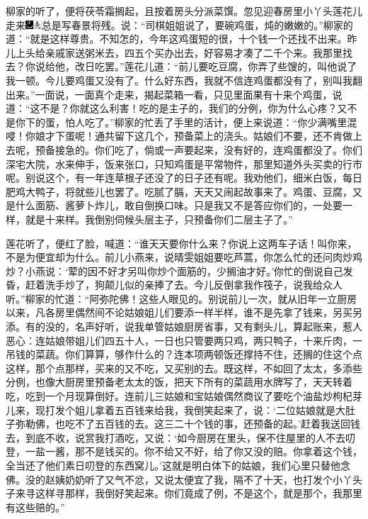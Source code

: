 柳家的听了，便将茯苓霜搁起，且按着房头分派菜馔。忽见迎春房里小丫头莲花儿走来{\includegraphics[width=3mm]{../Images/00003}\includegraphics[width=3mm]{../Images/00012}\footnotesize \kaishu 总是写春景将残。}说：“司棋姐姐说了，要碗鸡蛋，炖的嫩嫩的。”柳家的道：“就是这样尊贵。不知怎的，今年这鸡蛋短的很，十个钱一个还找不出来。昨儿上头给亲戚家送粥米去，四五个买办出去，好容易才凑了二千个来。我那里找去？你说给他，改日吃罢。”莲花儿道：“前儿要吃豆腐，你弄了些馊的，叫他说了我一顿。今儿要鸡蛋又没有了。什么好东西，我就不信连鸡蛋都没有了，别叫我翻出来。”一面说，一面真个走来，揭起菜箱一看，只见里面果有十来个鸡蛋，说道：“这不是？你就这么利害！吃的是主子的，我们的分例，你为什么心疼？又不是你下的蛋，怕人吃了。”柳家的忙丢了手里的活计，便上来说道：“你少满嘴里混唚！你娘才下蛋呢！通共留下这几个，预备菜上的浇头。姑娘们不要，还不肯做上去呢，预备接急的。你们吃了，倘或一声要起来，没有好的，连鸡蛋都没了。你们深宅大院，水来伸手，饭来张口，只知鸡蛋是平常物件，那里知道外头买卖的行市呢。别说这个，有一年连草根子还没了的日子还有呢。我劝他们，细米白饭，每日肥鸡大鸭子，将就些儿也罢了。吃腻了膈，天天又闹起故事来了。鸡蛋、豆腐，又是什么面筋、酱萝卜炸儿，敢自倒换口味。只是我又不是答应你们的，一处要一样，就是十来样。我倒别伺候头层主子，只预备你们二层主子了。”

莲花听了，便红了脸，喊道：“谁天天要你什么来？你说上这两车子话！叫你来，不是为便宜却为什么。前儿小燕来，说晴雯姐姐要吃芦蒿，你怎么忙的还问肉炒鸡炒？小燕说：‘荤的因不好才另叫你炒个面筋的，少搁油才好。’你忙的倒说自己发昏，赶着洗手炒了，狗颠儿似的亲捧了去。今儿反倒拿我作筏子，说我给众人听。”柳家的忙道：“阿弥陀佛！这些人眼见的。别说前儿一次，就从旧年一立厨房以来，凡各房里偶然间不论姑娘姐儿们要添一样半样，谁不是先拿了钱来，另买另添。有的没的，名声好听，说我单管姑娘厨房省事，又有剩头儿，算起账来，惹人恶心：连姑娘带姐儿们四五十人，一日也只管要两只鸡，两只鸭子，十来斤肉，一吊钱的菜蔬。你们算算，够作什么的？连本项两顿饭还撑持不住，还搁的住这个点这样，那个点那样，买来的又不吃，又买别的去。既这样，不如回了太太，多添些分例，也像大厨房里预备老太太的饭，把天下所有的菜蔬用水牌写了，天天转着吃，吃到一个月现算倒好。连前儿三姑娘和宝姑娘偶然商议了要吃个油盐炒枸杞芽儿来，现打发个姐儿拿着五百钱来给我，我倒笑起来了，说：‘二位姑娘就是大肚子弥勒佛，也吃不了五百钱的去。这三二十个钱的事，还预备的起。’赶着我送回钱去，到底不收，说赏我打酒吃，又说：‘如今厨房在里头，保不住屋里的人不去叨登，一盐一酱，那不是钱买的。你不给又不好，给了你又没的赔。你拿着这个钱，全当还了他们素日叨登的东西窝儿。’这就是明白体下的姑娘，我们心里只替他念佛。没的赵姨奶奶听了又气不忿，又说太便宜了我，隔不了十天，也打发个小丫头子来寻这样寻那样，我倒好笑起来。你们竟成了例，不是这个，就是那个，我那里有这些赔的。”

